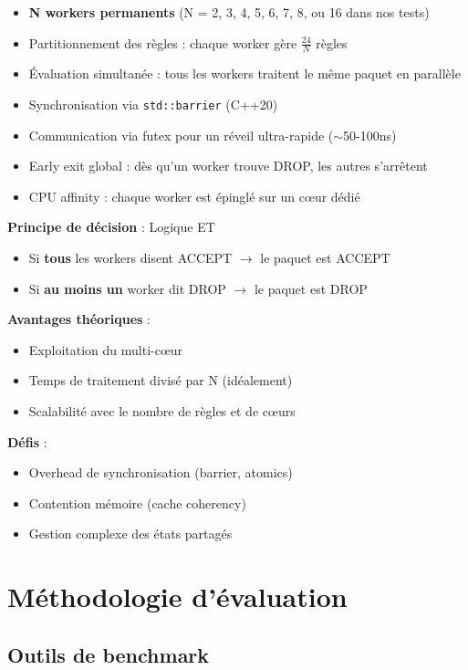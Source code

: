 \documentclass[12pt,a4paper]{article}
\begin{document}
\begin{itemize}
    \item \textbf{N workers permanents} (N = 2, 3, 4, 5, 6, 7, 8, ou 16 dans nos tests)
    \item Partitionnement des règles : chaque worker gère $\frac{24}{N}$ règles
    \item Évaluation simultanée : tous les workers traitent le même paquet en parallèle
    \item Synchronisation via \texttt{std::barrier} (C++20)
    \item Communication via futex pour un réveil ultra-rapide ($\sim$50-100ns)
    \item Early exit global : dès qu'un worker trouve DROP, les autres s'arrêtent
    \item CPU affinity : chaque worker est épinglé sur un cœur dédié
\end{itemize}

\textbf{Principe de décision} : Logique ET
\begin{itemize}
    \item Si \textbf{tous} les workers disent ACCEPT $\rightarrow$ le paquet est ACCEPT
    \item Si \textbf{au moins un} worker dit DROP $\rightarrow$ le paquet est DROP
\end{itemize}

\textbf{Avantages théoriques} :
\begin{itemize}
    \item Exploitation du multi-cœur
    \item Temps de traitement divisé par N (idéalement)
    \item Scalabilité avec le nombre de règles et de cœurs
\end{itemize}

\textbf{Défis} :
\begin{itemize}
    \item Overhead de synchronisation (barrier, atomics)
    \item Contention mémoire (cache coherency)
    \item Gestion complexe des états partagés
\end{itemize}

\section{Méthodologie d'évaluation}

\subsection{Outils de benchmark}
\end{document}
